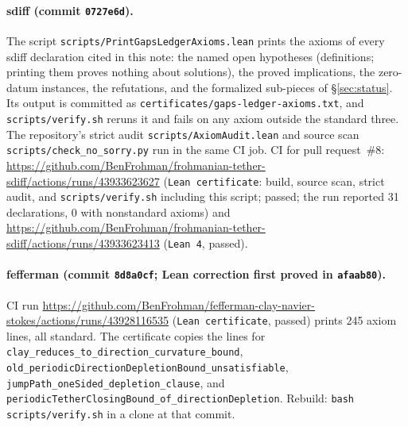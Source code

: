 \documentclass[11pt]{article}
\theoremstyle{plain}
\theoremstyle{definition}
\theoremstyle{remark}
\newcommand{\sdiffsha}{0727e6d}
\newcommand{\fefsha}{8d8a0cf}
\begin{document}
\paragraph{sdiff (commit \texttt{\sdiffsha}).}
The script \texttt{scripts/\hspace{0pt}PrintGapsLedgerAxioms.\hspace{0pt}lean} prints the axioms of every sdiff declaration cited in this note: the named open hypotheses (definitions; printing them proves nothing about solutions), the proved implications, the zero-datum instances, the refutations, and the formalized sub-pieces of \S\ref{sec:status}. Its output is committed as \texttt{certificates/\hspace{0pt}gaps-ledger-axioms.\hspace{0pt}txt}, and \texttt{scripts/\hspace{0pt}verify.\hspace{0pt}sh} reruns it and fails on any axiom outside the standard three. The repository's strict audit \texttt{scripts/\hspace{0pt}AxiomAudit.\hspace{0pt}lean} and source scan \texttt{scripts/\hspace{0pt}check\_\hspace{0pt}no\_\hspace{0pt}sorry.\hspace{0pt}py} run in the same CI job. CI for pull request~\#8: \url{https://github.com/BenFrohman/frohmanian-tether-sdiff/actions/runs/43933623627} (\texttt{Lean certificate}: build, source scan, strict audit, and \texttt{scripts/verify.sh} including this script; passed; the run reported 31 declarations, 0 with nonstandard axioms) and \url{https://github.com/BenFrohman/frohmanian-tether-sdiff/actions/runs/43933623413} (\texttt{Lean 4}, passed).

\paragraph{fefferman (commit \texttt{\fefsha}; Lean correction first proved in \texttt{afaab80}).}
CI run \url{https://github.com/BenFrohman/fefferman-clay-navier-stokes/actions/runs/43928116535} (\texttt{Lean certificate}, passed) prints 245 axiom lines, all standard. The certificate copies the lines for \texttt{clay\_\hspace{0pt}reduces\_\hspace{0pt}to\_\hspace{0pt}direction\_\hspace{0pt}curvature\_\hspace{0pt}bound}, \texttt{old\_\hspace{0pt}periodicDirectionDepletionBound\_\hspace{0pt}unsatisfiable}, \texttt{jumpPath\_\hspace{0pt}oneSided\_\hspace{0pt}depletion\_\hspace{0pt}clause}, and \texttt{periodicTetherClosingBound\_\hspace{0pt}of\_\hspace{0pt}directionDepletion}. Rebuild: \texttt{bash scripts/verify.sh} in a clone at that commit.
\end{document}
